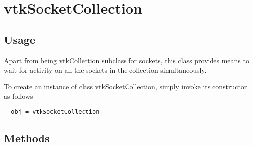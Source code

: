 \section{vtkSocketCollection}

\subsection{Usage}

 Apart from being vtkCollection subclass for sockets, this class
 provides means to wait for activity on all the sockets in the
 collection simultaneously.

To create an instance of class vtkSocketCollection, simply
invoke its constructor as follows
\begin{verbatim}
  obj = vtkSocketCollection
\end{verbatim}
\subsection{Methods}

